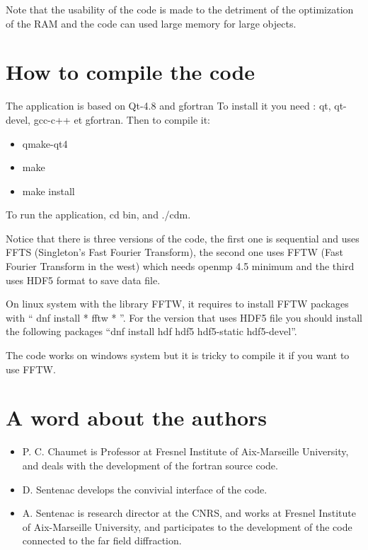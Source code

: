 Note that the usability of the code is made to the detriment of the
optimization of the RAM and the code can used large memory for large
objects.


\section{How to compile the code}

The application is based on Qt-4.8 and gfortran To install it you need
: qt, qt-devel, gcc-c++ et gfortran. Then to compile it:
\begin{itemize}
\item qmake-qt4
\item make
\item make install
\end{itemize}

To run the application, cd bin, and ./cdm.

Notice that there is three versions of the code, the first one is
sequential and uses FFTS (Singleton's Fast Fourier Transform), the
second one uses FFTW (Fast Fourier Transform in the west) which needs
openmp 4.5 minimum and the third uses HDF5 format to save data file.

On linux system with the library FFTW, it requires to install FFTW
packages with `` dnf install * fftw * ''. For the version that uses
HDF5 file you should install the following packages ``dnf install hdf
hdf5 hdf5-static hdf5-devel''.

The code works on windows system but it is tricky to compile it if you
want to use FFTW.



\section{A word about the authors}

\begin{itemize}
\item P. C. Chaumet is Professor at Fresnel Institute of Aix-Marseille
  University, and deals with the development of the fortran source
  code.
\item D. Sentenac develops the convivial interface of the code.
\item A. Sentenac is research director at the CNRS, and works at
  Fresnel Institute of Aix-Marseille University, and participates to
  the development of the code connected to the far field diffraction.
\end{itemize}

